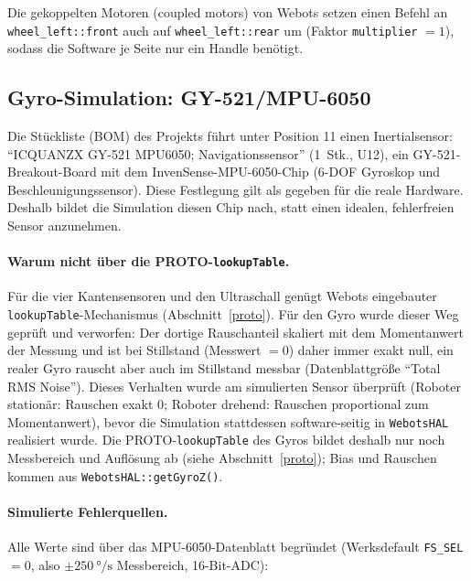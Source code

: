 \documentclass[
  a4paper,
  12pt,
  DIV=12,        %
  parskip=half,  %
  headings=small %
]{scrartcl}
\theoremstyle{definition}
\theoremstyle{definition}
\begin{document}
Die gekoppelten Motoren (coupled motors) von Webots setzen einen Befehl an
\texttt{wheel\_left::front}  auch auf
\texttt{wheel\_left::rear} um (Faktor \texttt{multiplier} $= 1$), sodass
die Software je Seite nur ein Handle benötigt.

\subsection{Gyro-Simulation: GY-521/MPU-6050}\label{gyro-simulation}

Die Stückliste (BOM) des Projekts führt unter Position 11 einen
Inertialsensor: \enquote{ICQUANZX GY-521 MPU6050; Navigationssensor}
(1~Stk., U12), ein GY-521-Breakout-Board mit dem
InvenSense-MPU-6050-Chip (6-DOF Gyroskop und Beschleunigungssensor). Diese
Festlegung gilt als gegeben für die reale Hardware. Deshalb bildet die Simulation
diesen Chip nach, statt einen idealen, fehlerfreien Sensor anzunehmen.

\paragraph{Warum nicht über die PROTO-\texttt{lookupTable}.}
Für die vier Kantensensoren und den Ultraschall genügt Webots eingebauter
\texttt{lookupTable}-Mechanismus (Abschnitt~\ref{proto}). Für den Gyro
wurde dieser Weg geprüft und verworfen: Der dortige Rauschanteil skaliert
mit dem Momentanwert der Messung und ist bei Stillstand (Messwert $= 0$)
daher immer exakt null, ein realer Gyro rauscht aber auch im Stillstand
messbar (Datenblattgröße \enquote{Total RMS Noise}). Dieses Verhalten
wurde am simulierten Sensor überprüft (Roboter stationär: Rauschen exakt
\num{0}; Roboter drehend: Rauschen proportional zum Momentanwert), bevor
die Simulation stattdessen software-seitig in \texttt{WebotsHAL} realisiert
wurde. Die PROTO-\texttt{lookupTable} des Gyros bildet deshalb nur noch
Messbereich und Auflösung ab (siehe Abschnitt~\ref{proto}); Bias und
Rauschen kommen aus \texttt{WebotsHAL::getGyroZ()}.

\paragraph{Simulierte Fehlerquellen.} Alle Werte sind über das
MPU-6050-Datenblatt begründet (Werksdefault \texttt{FS\_SEL} $=0$, also
$\pm\SI{250}{\degree\per\second}$ Messbereich, 16-Bit-ADC):
\end{document}
